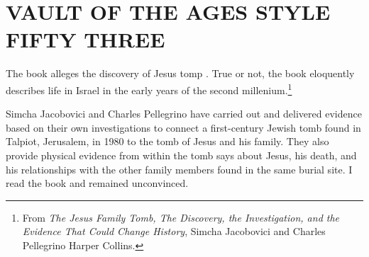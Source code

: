 


\chapter[Style 53]{VAULT OF THE AGES STYLE FIFTY THREE}


The book alleges the discovery of Jesus tomp \cite{style53}. True or not, the book eloquently describes  life in Israel in the early years of the second millenium.\footnote{From \textit{The
Jesus
Family
Tomb,   
The Discovery, the Investigation,
and the Evidence
That Could Change History}, 
Simcha Jacobovici and Charles Pellegrino
Harper Collins.}

Simcha Jacobovici and Charles
Pellegrino have carried out and delivered evidence based on their own investigations to 
connect a first-century Jewish tomb found in Talpiot, Jerusalem,
in 1980 to the tomb of Jesus and his family. They also provide physical evidence from within the tomb says about Jesus, his death, and his relationships with the other family members found in
the same burial site. I read the book and remained unconvinced. 

